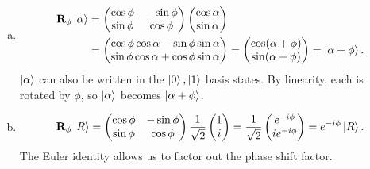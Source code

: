 \documentclass{book}
\theoremstyle{definition}
\newcommand{\nn}{\nonumber}
\newcommand{\al}{\alpha}
\newcommand{\f}[2]{\frac{#1}{#2}}
\begin{document}
\begin{enumerate}[(a)]
	\item 
	\begin{align}
	\mathbf{R}_\phi\ket{\al} &=  \begin{pmatrix}
	\cos\phi & -\sin\phi \\ \sin\phi & \cos\phi
	\end{pmatrix}\begin{pmatrix}
	\cos\al \\ \sin\al
	\end{pmatrix}\nn\\
	&= \begin{pmatrix}
	\cos\phi \cos\al - \sin\phi\sin\al \\
	\sin\phi \cos\al + \cos\phi \sin\al
	\end{pmatrix} = \begin{pmatrix}
	\cos(\al+\phi)\\\sin(\al+\phi)
	\end{pmatrix} = \ket{\al + \phi}.
	\end{align}
	$\ket{\al}$ can also be written in the $\ket{0}, \ket{1}$ basis states. By linearity, each is rotated by $\phi$, so $\ket{\al}$ becomes $\ket{\al + \phi}$.
	
	\item 
	\begin{align}
	\mathbf{R}_\phi \ket{R} = \begin{pmatrix}
	\cos\phi & -\sin\phi \\ \sin\phi & \cos\phi
	\end{pmatrix}\f{1}{\sqrt{2}}\begin{pmatrix}
	1\\i
	\end{pmatrix} = \f{1}{\sqrt{2}}\begin{pmatrix}
	e^{-i\phi}\\ie^{-i\phi}
	\end{pmatrix} = e^{-i\phi}\ket{R}.
	\end{align}
	The Euler identity allows us to factor out the phase shift factor.
	

\end{enumerate}
\end{document}
